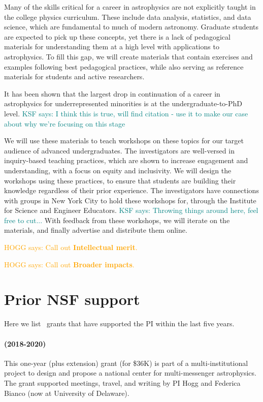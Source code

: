 \documentclass[12pt, fullpage, letterpaper]{article}
\newcommand{\KSF}[1]{\textcolor{teal}{KSF says: #1}}
\newcommand{\HOGG}[1]{\textcolor{orange}{HOGG says: #1}}
\begin{document}
Many of the skills critical for a career in astrophysics are not explicitly taught in the college physics curriculum. 
These include data analysis, statistics, and data science, which are fundamental to much of modern astronomy.
Graduate students are expected to pick up these concepts, yet there is a lack of pedagogical materials for understanding them at a high level with applications to astrophysics.
To fill this gap, we will create materials that contain exercises and examples following best pedagogical practices, while also serving as reference materials for students and active researchers.

It has been shown that the largest drop in continuation of a career in astrophysics for underrepresented minorities is at the undergraduate-to-PhD level. \KSF{I think this is true, will find citation - use it to make our case about why we're focusing on this stage}

We will use these materials to teach workshops on these topics for our target audience of advanced undergraduates.
The investigators are well-versed in inquiry-based teaching practices, which are shown to increase engagement and understanding, with a focus on equity and inclusivity.
We will design the workshops using these practices, to ensure that students are building their knowledge regardless of their prior experience.
The investigators have connections with groups in New York City to hold these workshops for, through the Institute for Science and Engineer Educators. \KSF{Throwing things around here, feel free to cut...}
With feedback from these workshops, we will iterate on the materials, and finally advertise and distribute them online. 

\HOGG{Call out \textbf{Intellectual merit}.}

\HOGG{Call out \textbf{Broader impacts}.}

\section{Prior NSF support}

Here we list \NSF\ grants that have supported the PI within the last five years.

\paragraph{
 (2018-2020)}
This one-year (plus extension) grant (for \$36K) is part of a multi-institutional project
to design and propose a national center for multi-messenger astrophysics. The grant supported
meetings, travel, and writing by PI Hogg and Federica Bianco (now at University of Delaware).
\end{document}
